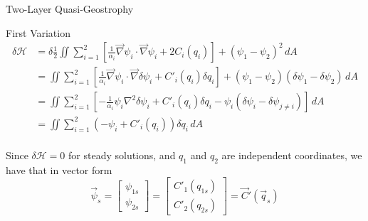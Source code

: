 \documentclass[12pt]{article}
\begin{document}
\begin{section}{Two-Layer Quasi-Geostrophy}
    \begin{subsection}{First Variation}
        \begin{align*}
            \delta \mathcal{H} &= \delta \frac12 \iint \sum_{i=1}^2 \left[ \frac{1}{\alpha_i} \vec\nabla \psi_i \cdot \vec\nabla \psi_i + 2C_i(q_i) \right]+ (\psi_1 - \psi_2)^2 \, dA \\
            &= \iint \sum_{i=1}^2 \left[ \frac{1}{\alpha_i} \vec\nabla \psi_i \cdot \vec\nabla \delta\psi_i + C'_i(q_i) \delta q_i \right]+ (\psi_1 - \psi_2)(\delta \psi_1 - \delta \psi_2) \, dA \\
            &= \iint \sum_{i=1}^2 \left[ -\frac{1}{\alpha_i} \psi_i \nabla^2 \delta\psi_i + C'_i(q_i) \delta q_i - \psi_i(\delta \psi_i - \delta \psi_{j \ne i}) \right] \, dA \\
            &= \iint \sum_{i=1}^2 (-\psi_i + C'_i(q_i)) \delta q_i\, dA \\
        \end{align*}

        Since $\delta \mathcal{H} = 0$ for steady solutions, and $q_1$ and $q_2$ are independent coordinates, we have that in vector form
        \begin{equation}
            \vec \psi_s =
            \left[\begin{array}{c}
            \psi_{1s} \\
            \psi_{2s}
            \end{array}\right]
            =
            \left[\begin{array}{c}
            C'_1(q_{1s}) \\
            C'_2(q_{2s})
            \end{array}\right]
            =
            \vec C'(\vec q_s)
        \end{equation}
    \end{subsection}


\end{section}
\end{document}
